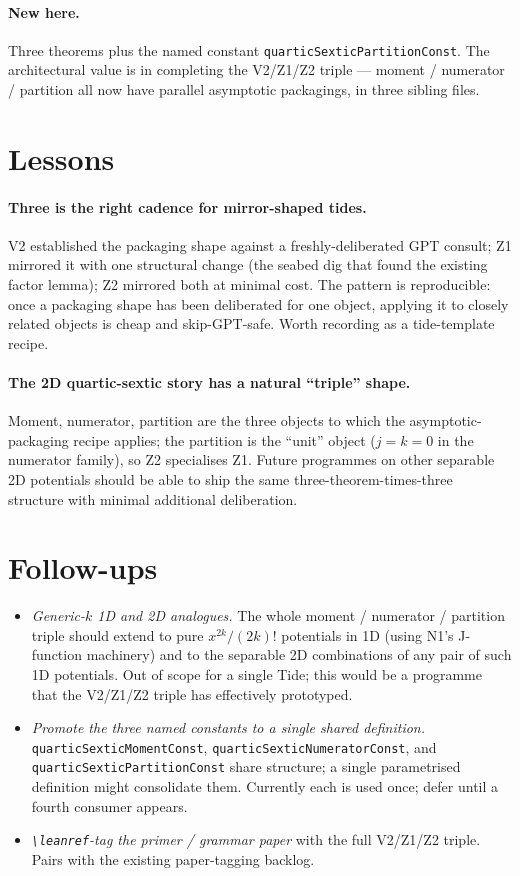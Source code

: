 \documentclass[11pt]{article}
\begin{document}
\paragraph{New here.} Three theorems plus the named constant
\texttt{quarticSexticPartitionConst}. The architectural value is in
completing the V2/Z1/Z2 triple --- moment / numerator / partition
all now have parallel asymptotic packagings, in three sibling files.

\section{Lessons}

\paragraph{Three is the right cadence for mirror-shaped tides.} V2
established the packaging shape against a freshly-deliberated GPT
consult; Z1 mirrored it with one structural change (the seabed dig
that found the existing factor lemma); Z2 mirrored both at minimal
cost. The pattern is reproducible: once a packaging shape has been
deliberated for one object, applying it to closely related objects
is cheap and skip-GPT-safe. Worth recording as a tide-template
recipe.

\paragraph{The 2D quartic-sextic story has a natural ``triple''
shape.} Moment, numerator, partition are the three objects to which
the asymptotic-packaging recipe applies; the partition is the
``unit'' object ($j = k = 0$ in the numerator family), so Z2
specialises Z1. Future programmes on other separable 2D potentials
should be able to ship the same three-theorem-times-three structure
with minimal additional deliberation.

\section{Follow-ups}

\begin{itemize}[leftmargin=1.5em]
\item \emph{Generic-$k$ 1D and 2D analogues.} The whole moment /
  numerator / partition triple should extend to pure $x^{2k}/(2k)!$
  potentials in 1D (using N1's J-function machinery) and to the
  separable 2D combinations of any pair of such 1D potentials. Out
  of scope for a single Tide; this would be a programme that the
  V2/Z1/Z2 triple has effectively prototyped.
\item \emph{Promote the three named constants to a single shared
  definition.} \texttt{quarticSexticMomentConst},
  \texttt{quarticSexticNumeratorConst}, and
  \texttt{quarticSexticPartitionConst} share structure; a single
  parametrised definition might consolidate them. Currently each is
  used once; defer until a fourth consumer appears.
\item \emph{\texttt{\textbackslash leanref}-tag the primer / grammar
  paper} with the full V2/Z1/Z2 triple. Pairs with the existing
  paper-tagging backlog.
\end{itemize}
\end{document}
